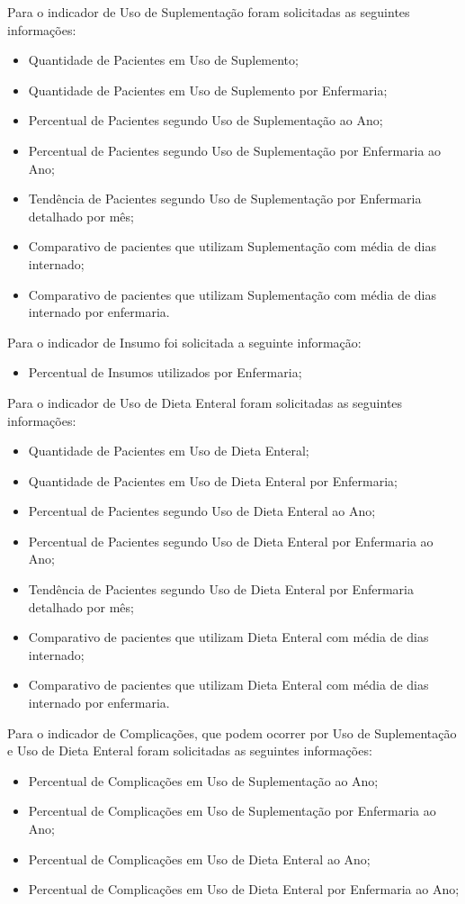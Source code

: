 Para o indicador de Uso de Suplementação foram solicitadas as seguintes informações:
\begin{itemize}
    \item Quantidade de Pacientes em Uso de Suplemento;
    \item Quantidade de Pacientes em Uso de Suplemento por Enfermaria;
    \item Percentual de Pacientes segundo Uso de Suplementação ao Ano;
    \item Percentual de Pacientes segundo Uso de Suplementação por Enfermaria ao Ano;
    \item Tendência de Pacientes segundo Uso de Suplementação por Enfermaria detalhado por mês;
    \item Comparativo de pacientes que utilizam Suplementação com média de dias internado;
    \item Comparativo de pacientes que utilizam Suplementação com média de dias internado por enfermaria.
\end{itemize}

Para o indicador de Insumo foi solicitada a seguinte informação:
\begin{itemize}
    \item Percentual de Insumos utilizados por Enfermaria;
\end{itemize}

Para o indicador de Uso de Dieta Enteral foram solicitadas as seguintes informações:
\begin{itemize}
    \item Quantidade de Pacientes em Uso de Dieta Enteral;
    \item Quantidade de Pacientes em Uso de Dieta Enteral por Enfermaria;
    \item Percentual de Pacientes segundo Uso de Dieta Enteral ao Ano;
    \item Percentual de Pacientes segundo Uso de Dieta Enteral por Enfermaria ao Ano;
    \item Tendência de Pacientes segundo Uso de Dieta Enteral por Enfermaria detalhado por mês;
    \item Comparativo de pacientes que utilizam Dieta Enteral com média de dias internado;
    \item Comparativo de pacientes que utilizam Dieta Enteral com média de dias internado por enfermaria.
\end{itemize}

Para o indicador de Complicações, que podem ocorrer por Uso de Suplementação e Uso de Dieta Enteral foram solicitadas as seguintes informações:
\begin{itemize}
    \item Percentual de Complicações em Uso de Suplementação ao Ano;
    \item Percentual de Complicações em Uso de Suplementação por Enfermaria ao Ano;
    \item Percentual de Complicações em Uso de Dieta Enteral ao Ano;
    \item Percentual de Complicações em Uso de Dieta Enteral por Enfermaria ao Ano;
\end{itemize}


